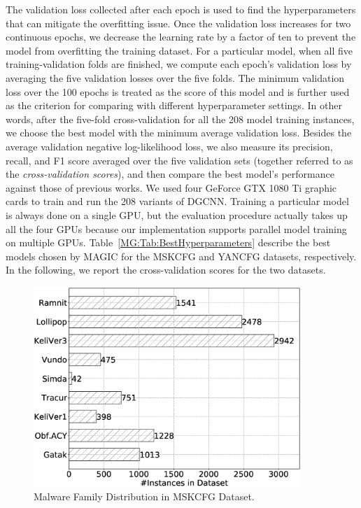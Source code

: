 The validation loss collected after each epoch is used to find the hyperparameters that can mitigate the overfitting issue. Once the validation loss increases for two continuous epochs,
we decrease the learning rate by a factor of ten to prevent the model from overfitting the training dataset.
For a particular model, when all five training-validation folds are finished, we compute each epoch's validation loss by averaging the five validation losses over the five folds.
The minimum validation loss over the 100 epochs is treated as the score of this model and is further used as the criterion for comparing with different hyperparameter settings.
In other words, after the five-fold cross-validation for all the 208 model training instances, we choose the best model with the minimum average validation loss.
Besides the average validation negative log-likelihood loss,
we also measure its precision, recall, and F1 score averaged over the five validation sets (together referred to as the \emph{cross-validation scores}), and then compare the best model's performance against those of previous works.
We used four GeForce GTX 1080 Ti graphic cards to train and run the 208 variants of DGCNN.
Training a particular model is always done on a single GPU,
but the evaluation procedure actually takes up all the four GPUs because our \sysname implementation supports parallel model training on multiple GPUs.
Table~\ref{MG:Tab:BestHyperparameters} describe the best models chosen by MAGIC for the MSKCFG and YANCFG datasets, respectively.
In the following, we report the cross-validation scores for the two datasets.

\begin{figure}
    \centerline{\includegraphics[width=0.90\textwidth]{Magic/figures/MsAcfgLabelDist.eps}}
    \caption{Malware Family Distribution in MSKCFG Dataset.}
    \label{MG:Fig:MSKCFGLabelDist}
\end{figure}

